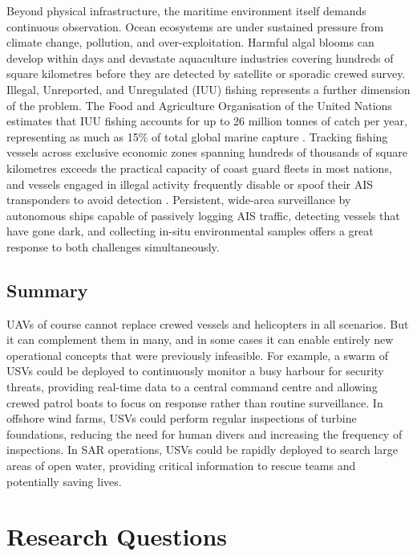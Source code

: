 \vspace{1cm}

Beyond physical infrastructure, the maritime environment itself demands 
continuous observation. Ocean ecosystems are under sustained pressure 
from climate change, pollution, and over-exploitation.
Harmful algal blooms can develop within days 
and devastate aquaculture industries covering hundreds of square 
kilometres before they are detected by satellite or sporadic crewed 
survey. 
Illegal, Unreported, and Unregulated (IUU) 
fishing represents a further dimension of the problem. The Food and 
Agriculture Organisation of the United Nations estimates that IUU 
fishing accounts for up to 26 million tonnes of catch per year, 
representing as much as 15\% of total global marine capture 
\cite{ec_iuu_fishing2024}. Tracking fishing vessels across exclusive economic 
zones spanning hundreds of thousands of square kilometres exceeds the 
practical capacity of coast guard fleets in most nations, and vessels 
engaged in illegal activity frequently disable or spoof their AIS 
transponders to avoid detection \cite{marinetraffic_ais_spoofing}. Persistent, 
wide-area surveillance by autonomous ships capable of 
passively logging AIS traffic, detecting vessels that have gone dark, 
and collecting in-situ environmental samples offers a great 
response to both challenges simultaneously.

\vspace{1cm}

\subsection{Summary}
UAVs of course cannot replace crewed vessels and helicopters in all scenarios. But it can complement them in many, and in some cases it can enable entirely new operational concepts that were previously infeasible. For example, a swarm of USVs could be deployed to continuously monitor a busy harbour for security threats, providing real-time data to a central command centre and allowing crewed patrol boats to focus on response rather than routine surveillance. In offshore wind farms, USVs could perform regular inspections of turbine foundations, reducing the need for human divers and increasing the frequency of inspections. In SAR operations, USVs could be rapidly deployed to search large areas of open water, providing critical information to rescue teams and potentially saving lives. 




\section{Research Questions}
\label{sec:research_questions}

